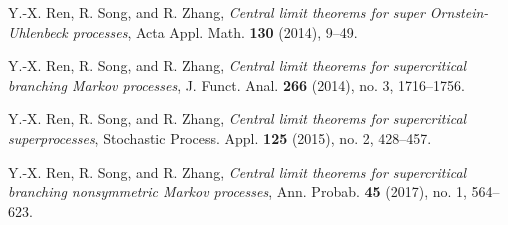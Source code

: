 \documentclass[12pt,a4paper]{amsart}
\theoremstyle{plain}
\theoremstyle{definition}
\numberwithin{equation}{section}
\begin{document}
\begin{thebibliography}{10}
  Y.-X. Ren, R. Song, and R. Zhang,
  \emph{Central limit theorems for super {O}rnstein-{U}hlenbeck processes},
  Acta Appl. Math. \textbf{130} (2014), 9--49.

  Y.-X. Ren, R. Song, and R. Zhang,
  \emph{Central limit theorems for supercritical branching {M}arkov processes},
  J. Funct. Anal. \textbf{266} (2014), no. 3, 1716--1756.

  Y.-X. Ren, R. Song, and R. Zhang,
  \emph{Central limit theorems for supercritical superprocesses},
  Stochastic Process. Appl. \textbf{125} (2015), no. 2, 428--457.

  Y.-X. Ren, R. Song, and R. Zhang,
  \emph{Central limit theorems for supercritical branching nonsymmetric {M}arkov processes},
  Ann. Probab. \textbf{45} (2017), no. 1, 564--623.

%
%
%
%

\end{thebibliography}
\end{document}
